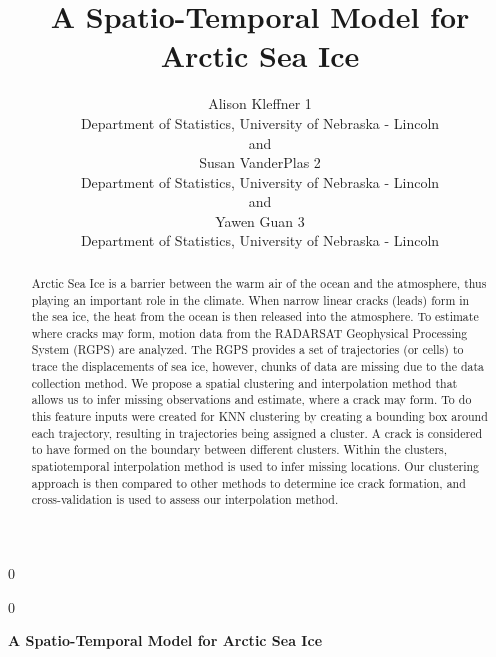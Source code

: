 \documentclass[12pt]{article}
\newcommand{\blind}{0}
\begin{document}
\def\spacingset#1{\renewcommand{\baselinestretch}%
{#1}\small\normalsize} \spacingset{1}



\blind
{
  \title{\bf A Spatio-Temporal Model for Arctic Sea Ice}

  \author{
        Alison Kleffner 1 \\
    Department of Statistics, University of Nebraska - Lincoln\\
     and \\     Susan VanderPlas 2 \\
    Department of Statistics, University of Nebraska - Lincoln\\
     and \\     Yawen Guan 3 \\
    Department of Statistics, University of Nebraska - Lincoln\\
      }
  \maketitle
} \fi

\blind
{
  \bigskip
  \bigskip
  \bigskip
  \begin{center}
    {\LARGE\bf A Spatio-Temporal Model for Arctic Sea Ice}
  \end{center}
  \medskip
} \fi

\bigskip
\begin{abstract}
Arctic Sea Ice is a barrier between the warm air of the ocean and the
atmosphere, thus playing an important role in the climate. When narrow
linear cracks (leads) form in the sea ice, the heat from the ocean is
then released into the atmosphere. To estimate where cracks may form,
motion data from the RADARSAT Geophysical Processing System (RGPS) are
analyzed. The RGPS provides a set of trajectories (or cells) to trace
the displacements of sea ice, however, chunks of data are missing due to
the data collection method. We propose a spatial clustering and
interpolation method that allows us to infer missing observations and
estimate, where a crack may form. To do this feature inputs were created
for KNN clustering by creating a bounding box around each trajectory,
resulting in trajectories being assigned a cluster. A crack is
considered to have formed on the boundary between different clusters.
Within the clusters, spatiotemporal interpolation method is used to
infer missing locations. Our clustering approach is then compared to
other methods to determine ice crack formation, and cross-validation is
used to assess our interpolation method.
\end{abstract}
\end{document}
